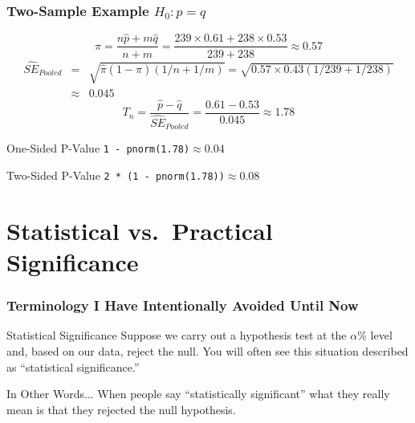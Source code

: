 \begin{frame}
	\frametitle{Two-Sample Example $H_0\colon p = q$}
	\small
$$\widehat{\pi} = \frac{n\widehat{p}+ m\widehat{q}}{n + m} = \frac{239 \times 0.61 + 238 \times 0.53}{239 + 238}\approx 0.57$$
	\begin{eqnarray*}
	\widehat{SE}_{Pooled} &=&  \sqrt{\widehat{\pi}(1-\widehat{\pi})\left( 1/n + 1/m \right) }= \sqrt{0.57 \times 0.43 (1/239 + 1/238)}\\
		&\approx& 0.045
	\end{eqnarray*}
$$T_n = \frac{\widehat{p} - \widehat{q}}{\widehat{SE}_{Pooled}}= \frac{0.61 - 0.53}{0.045} \approx 1.78$$

\vspace{-1em}
\begin{block}
	{One-Sided P-Value}
	\texttt{1 - pnorm(1.78)}$\approx 0.04$
\end{block}\begin{block}
	{Two-Sided P-Value}
	\texttt{2 * (1 - pnorm(1.78))}$\approx 0.08$
\end{block}
\end{frame}
\section{Statistical vs.\ Practical Significance}
\begin{frame}
\frametitle{Terminology I Have Intentionally Avoided Until Now}

\begin{block}{Statistical Significance}
Suppose we carry out a hypothesis test at the $\alpha\%$ level and,  based on our data, reject the null. You will often see this situation described as ``statistical significance.''
\end{block}

\begin{block}{In Other Words...}
When people say ``statistically significant'' what they really mean is that they rejected the null hypothesis.
\end{block}
\end{frame}

